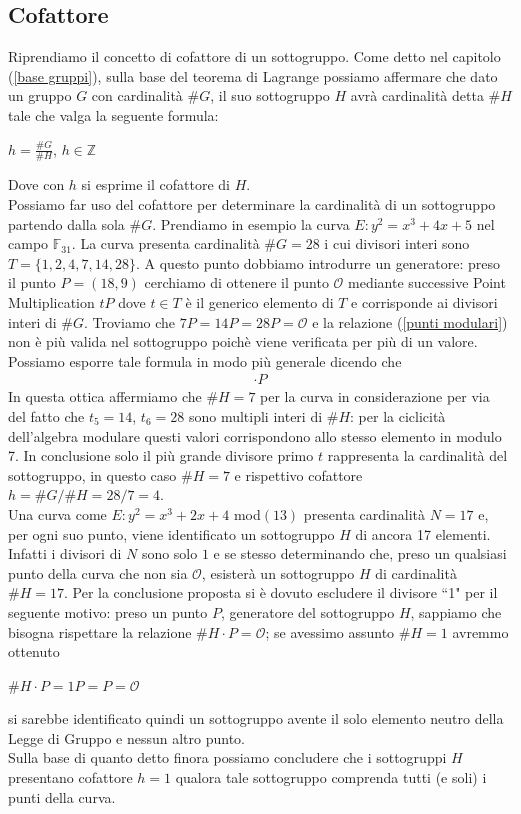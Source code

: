 \documentclass[a4paper,12pt]{tesiinfo}
\newcommand\ddfrac[2]{\frac{\displaystyle #1}{\displaystyle #2}}
\begin{document}
\subsection{Cofattore}
Riprendiamo il concetto di cofattore di un sottogruppo. Come detto nel capitolo (\ref{base gruppi}), sulla base del teorema di Lagrange possiamo affermare che dato un gruppo $G$ con cardinalit\`a $\#G$, il suo sottogruppo $H$ avr\`a cardinalit\`a detta $\#H$ tale che valga la seguente formula:
\begin{center}
 $h = \ddfrac{\#G}{\#H}$, $h \in \mathbb{Z}$
\end{center}
Dove con $h$ si esprime il cofattore di $H$.
\\
Possiamo far uso del cofattore per determinare la cardinalit\`a di un sottogruppo partendo dalla sola $\#G$. Prendiamo in esempio la curva $E : y^2 = x^3+4x+5$ nel campo $\mathbb{F}_{31}$. La curva presenta cardinalit\`a $\#G=28$ i cui divisori interi sono $T = \{1, 2, 4, 7, 14, 28\}$. A questo punto dobbiamo introdurre un generatore: preso il punto $P=(18, 9)$ cerchiamo di ottenere il punto $\mathcal{O}$ mediante successive Point Multiplication $tP$ dove $t \in T$ \`e il generico elemento di $T$ e corrisponde ai divisori interi di $\#G$. Troviamo che $7P = 14P=28P= \mathcal{O}$ e la relazione (\ref{punti modulari}) non \`e pi\`u valida nel sottogruppo poich\`e viene verificata per pi\`u di un valore. Possiamo esporre tale formula in modo pi\`u generale dicendo che \begin{gather}
[k \text{ mod} (\#H)] \cdot P
\end{gather}
In questa ottica affermiamo che $\#H=7$ per la curva in considerazione per via del fatto che $t_5=14$, $t_6=28$ sono multipli interi di $\#H$: per la ciclicit\`a dell'algebra modulare questi valori corrispondono allo stesso elemento in modulo 7. In conclusione solo il pi\`u grande divisore primo $t$ rappresenta la cardinalit\`a del sottogruppo, in questo caso $\#H = 7$ e rispettivo cofattore $h = \#G/\#H=28/7 = 4$.
\\
Una curva come $E: y^2 = x^3 +2x+4$ mod$(13)$ presenta cardinalit\`a $N=17$ e, per ogni suo punto, viene identificato un sottogruppo $H$ di ancora 17 elementi. Infatti i divisori di $N$ sono solo $1$ e se stesso determinando che, preso un qualsiasi punto della curva che non sia $\mathcal{O}$, esister\`a un sottogruppo $H$ di cardinalit\`a $\#H = 17$. Per la conclusione proposta si \`e dovuto escludere il divisore ``1" per il seguente motivo: preso un punto $P$, generatore del sottogruppo $H$, sappiamo che bisogna rispettare la relazione $\#H \cdot P = \mathcal{O}$; se avessimo assunto $\#H = 1$ avremmo ottenuto
\begin{center}
 $\#H \cdot P = 1P = P = \mathcal{O}$
\end{center}
si sarebbe identificato quindi un sottogruppo avente il solo elemento neutro della Legge di Gruppo e nessun altro punto.
\\
Sulla base di quanto detto finora possiamo concludere che i sottogruppi $H$ presentano cofattore $h=1$ qualora tale sottogruppo comprenda tutti (e soli) i punti della curva.
\end{document}
